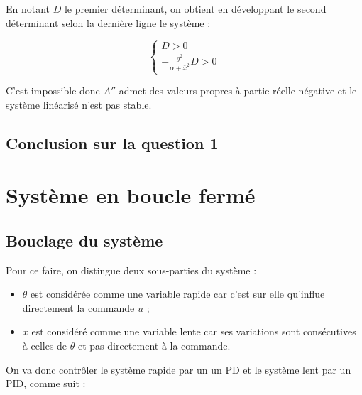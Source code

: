 \documentclass[10pt]{article}
\begin{document}
\vspace{10px}

\noindent En notant $D$ le premier déterminant, on obtient en développant le second déterminant selon la dernière
ligne le système :

\[
	\begin{cases}
		D > 0 \\
		- \frac{g^2}{\alpha + \bar x^2} D > 0
	\end{cases}
\]

\noindent C'est impossible donc $A''$ admet des valeurs propres à partie réelle négative et le système linéarisé n'est
pas stable.

\subsection*{Conclusion sur la question 1}


\section{Système en boucle fermé}

\newcommand{\kt}{k_{\theta}}
\newcommand{\kdx}{k^d_x}
\newcommand{\kdt}{k^d_{\theta}}
\newcommand{\fact}[1]{\frac{g #1 }{\alpha + \bar x^2}} %

\subsection*{Bouclage du système}

\noindent Pour ce faire, on distingue deux sous-parties du système :

\begin{itemize}
	\item $\theta$ est considérée comme une variable rapide car c'est sur elle qu'influe directement la commande $u$ ;
	\item $x$ est considéré comme une variable lente car ses variations sont consécutives à celles de $\theta$ et
	pas directement à la commande.
\end{itemize}

\noindent On va donc contrôler le système rapide par un un PD et le système lent par un PID, comme suit :
\end{document}
